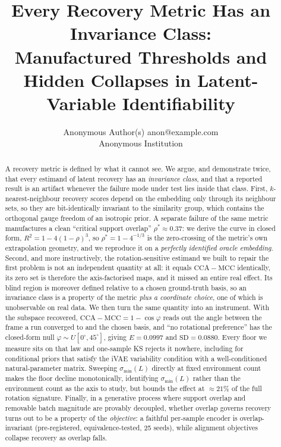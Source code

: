 \documentclass[10pt]{article}
\title{Every Recovery Metric Has an Invariance Class:\\ Manufactured Thresholds
and Hidden Collapses in Latent-Variable Identifiability}
\author{\name Anonymous Author(s) \email anon@example.com \\
      \addr Anonymous Institution}
\newcommand{\gap}{\ensuremath{\mathrm{CCA}\!-\!\mathrm{MCC}}}
\newcommand{\smin}{\ensuremath{\sigma_{\min}(L)}}
\begin{document}
\maketitle

\begin{abstract}
A recovery metric is defined by what it cannot see. We argue, and demonstrate twice, that every
estimand of latent recovery has an \emph{invariance class}, and that a reported result is an artifact
whenever the failure mode under test lies inside that class. First, $k$-nearest-neighbour recovery
scores depend on the embedding only through its neighbour sets, so they are bit-identically invariant
to the similarity group, which contains the orthogonal gauge freedom of an isotropic prior. A separate
failure of the same metric manufactures a clean ``critical support overlap'' $\rho^{*}\approx 0.37$: we
derive the curve in closed form, $R^{2}=1-4(1-\rho)^{3}$, so $\rho^{*}=1-4^{-1/3}$ is the zero-crossing
of the metric's own extrapolation geometry, and we reproduce it on a \emph{perfectly identified oracle
embedding}. Second, and more instructively, the rotation-sensitive estimand we built to repair the first
problem is not an independent quantity at all: it equals $\gap$ identically, its zero set is therefore
the axis-factorised maps, and it missed an entire real effect. Its blind region is moreover defined
relative to a chosen ground-truth basis, so an invariance class is a property of the metric \emph{plus a
coordinate choice}, one of which is unobservable on real data. We then turn the same quantity into an
instrument. With the subspace recovered, $\gap = 1-\cos\varphi$ reads out the angle between the frame a
run converged to and the chosen basis, and ``no rotational preference'' has the closed-form null
$\varphi\sim U[0^{\circ},45^{\circ}]$, giving $E=0.0997$ and $\mathrm{SD}=0.0880$. Every floor we
measure sits on that law and one-sample KS rejects it nowhere, including for conditional priors that
satisfy the iVAE variability condition with a well-conditioned natural-parameter matrix. Sweeping
$\smin$ directly at fixed environment count makes the floor decline monotonically, identifying $\smin$
rather than the environment count as the axis to study, but bounds the effect at $\approx21\%$ of the
full rotation signature. Finally, in a generative process where support overlap and removable batch
magnitude are provably decoupled, whether overlap governs recovery turns out to be a property of the
\emph{objective}: a faithful per-sample encoder is overlap-invariant (pre-registered,
equivalence-tested, 25 seeds), while alignment objectives collapse recovery as overlap falls.
\end{abstract}
\end{document}
